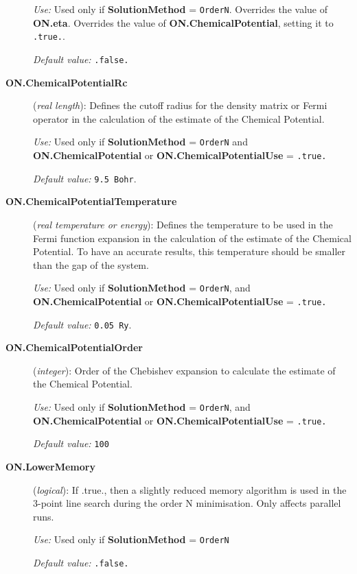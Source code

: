 \documentclass[11pt]{article}
\begin{document}
\begin{description}
{\it Use:} Used only if {\bf SolutionMethod} = {\tt OrderN}.
Overrides the value of {\bf ON.eta}.
Overrides the value of {\bf ON.ChemicalPotential}, setting
it to {\tt .true.}.

{\it Default value:} {\tt .false.}

\item[{\bf ON.ChemicalPotentialRc}]  ({\it real length}):
Defines the cutoff radius for the density matrix or Fermi
operator in the calculation of the estimate of the
Chemical Potential.

{\it Use:} Used only if {\bf SolutionMethod} = {\tt OrderN}
and {\bf ON.ChemicalPotential} or  {\bf ON.ChemicalPotentialUse} 
= {\tt .true.}

{\it Default value:} {\tt 9.5 Bohr}.

\item[{\bf ON.ChemicalPotentialTemperature}]  ({\it real temperature 
or energy}):
Defines the temperature to be used in the Fermi function expansion
in the calculation of the estimate of the Chemical Potential.
To have an accurate results, this temperature should be smaller 
than the gap of the system.

{\it Use:} Used only if {\bf SolutionMethod} = {\tt OrderN},
and {\bf ON.ChemicalPotential} or  {\bf ON.ChemicalPotentialUse} = 
{\tt .true.}

{\it Default value:} {\tt 0.05 Ry}.

\item[{\bf ON.ChemicalPotentialOrder}] ({\it integer}):
Order of the Chebishev expansion to calculate the estimate
of the Chemical Potential. 

{\it Use:} Used only if {\bf SolutionMethod} = {\tt OrderN},
and {\bf ON.ChemicalPotential} or  {\bf ON.ChemicalPotentialUse} = 
{\tt .true.}

{\it Default value:} {\tt 100}

\item[{\bf ON.LowerMemory}] ({\it logical}): 
If .true., then a slightly reduced memory algorithm is used in the 
3-point line search during the order N minimisation. Only affects
parallel runs.

{\it Use:} Used only if  {\bf SolutionMethod} = {\tt OrderN}

{\it Default value:} {\tt .false.}
        
\end{description}
\end{document}
